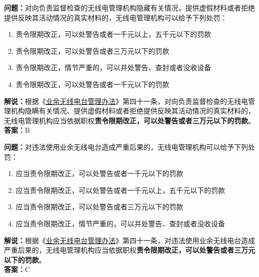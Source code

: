 \textbf{问题：}对向负责监督检查的无线电管理机构隐藏有关情况，提供虚假材料或者拒绝提供反映其活动情况的真实材料的，无线电管理机构可以给予下列处罚：
\begin{enumerate}[label=\Alph*), leftmargin=1.5cm]
  \item 责令限期改正，可以处警告或者一千元以上，五千元以下的罚款
  \item 责令限期改正，可以处警告或者三万元以下的罚款
  \item 责令限期改正，情节严重的，可以并处警告、查封或者没收设备
  \item 责令限期改正，可以处警告或者一千元以下的罚款
\end{enumerate}
\textbf{解说：}根据《\href{https://www.miit.gov.cn/jgsj/zfs/bmgz/art/2020/art_147b69815b3641caad9047735f94c860.html}{业余无线电台管理办法}》第四十一条，对向负责监督检查的无线电管理机构隐瞒有关情况、提供虚假材料或者拒绝提供反映其活动情况的真实材料的，无线电管理机构应当依据职权\textbf{责令限期改正，可以处警告或者三万元以下的罚款}。\\
\textbf{答案：}B


\textbf{问题：}对违法使用业余无线电台造成严重后果的，无线电管理机构可以给予下列处罚：
\begin{enumerate}[label=\Alph*), leftmargin=1.5cm]
  \item 应当责令限期改正，可以处警告或者一千元以下的罚款
  \item 应当责令限期改正，可以处警告或者一千元以上，五千元以下的罚款
  \item 应当责令限期改正，可以处警告或者三万元以下的罚款
  \item 应当责令限期改正，情节严重的，可以并处警告、查封或者没收设备
\end{enumerate}
\textbf{解说：}根据《\href{https://www.miit.gov.cn/jgsj/zfs/bmgz/art/2020/art_147b69815b3641caad9047735f94c860.html}{业余无线电台管理办法}》第四十一条，对违法使用业余无线电台造成严重后果的，无线电管理机构应当依据职权\textbf{责令限期改正，可以处警告或者三万元以下的罚款}。\\
\textbf{答案：}C

